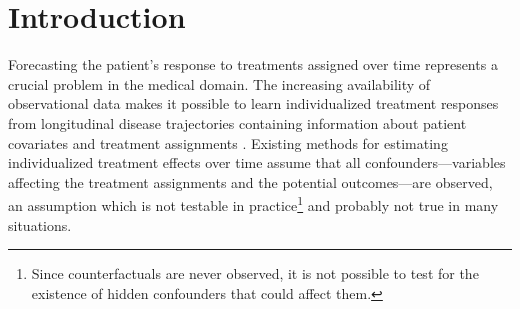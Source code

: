 \documentclass{article}
\begin{document}
\begin{abstract}
The estimation of treatment effects is a pervasive problem in medicine. Existing methods for estimating treatment effects from longitudinal observational data assume that there are no hidden confounders, an assumption that is not testable in practice and, if it does not hold, leads to biased estimates. In this paper, we develop the Time Series Deconfounder, a method that leverages the assignment of multiple treatments over time to enable the estimation of treatment effects in the presence of multi-cause hidden confounders. The Time Series Deconfounder uses a novel recurrent neural network architecture with multitask output to build a factor model over time and infer latent variables that render the assigned treatments conditionally independent; then, it performs causal inference using these latent variables that act as substitutes for the multi-cause unobserved confounders. We provide a theoretical analysis for obtaining unbiased causal effects of time-varying exposures using the Time Series Deconfounder. Using both simulated and real data we show the effectiveness of our method in deconfounding the estimation of treatment responses over time. 
\end{abstract}




	\section{Introduction}
	
	Forecasting the patient's response to treatments assigned over time represents a crucial problem in the medical domain. The increasing availability of observational data makes it possible to learn individualized treatment responses from longitudinal disease trajectories containing information about patient covariates and treatment assignments \citep{robins2000marginal, robins2008estimation, schulam2017reliable, lim2018forecasting, bica2020estimating}. Existing methods for estimating individualized treatment effects over time assume that all confounders---variables affecting the treatment assignments and the potential outcomes---are observed, an assumption which is not testable in practice\footnote{Since counterfactuals are never observed, it is not possible to test for the existence of hidden confounders that could affect them.} and probably not true in many situations.
	
\end{document}
